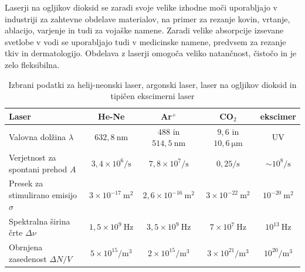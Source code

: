 Laserji na ogljikov dioksid se zaradi svoje velike izhodne moči uporabljajo v 
industriji za zahtevne obdelave materialov, na primer za rezanje 
kovin, vrtanje, ablacijo, varjenje in tudi za vojaške namene. Zaradi velike
absorpcije izsevane svetlobe v vodi se uporabljajo tudi v medicinske namene, predvsem
za rezanje tkiv in dermatologijo. 
Obdelava z laserji omogoča veliko natančnost, čistočo in je zelo fleksibilna.

\begin{table}
\small
\begin{center}
\setlength\tabcolsep{4pt}
\begin{tabular}{|l|c|c|c|c|}\hline
Laser & He-Ne & Ar$^+$ & CO$_2$ & ekscimer\\ \hline
Valovna dolžina  $\lambda$ & $632,8~\si{\nano\metre}$& $488$ in
$514,5~\si{\nano\metre}$ & $9,6$ in $10,6~\si{\micro\metre}$ & UV
\\ \hline
Verjetnost za spontani prehod $A$ & $3,4 \times 10^6/\si{\second}$ & 
$7,8 \times 10^7/\si{\second}$ & $0,25/\si{\second}$ & $\sim 10^8/\si{\second}$ \\ \hline
Presek za stimulirano emisijo $\sigma$ & $3 \times 10^{-17}~\si{\metre}^2$&  $2,6 \times 10^{-16}~\si{\metre}^2$ & $3 \times 10^{-22}~\si{\metre}^2$ & $ 10^{-20}~\si{\metre}^2$ \\ \hline
Spektralna širina črte $\Delta \nu$ & $1,5 \times 10^{9}~\si{\hertz}$ & 
$3,5 \times 10^{9}~\si{\hertz}$ &$7 \times 10^{7}~\si{\hertz}$ & $10^{13}~\si{\hertz}$ \\ \hline
Obrnjena zasedenost $\Delta N/V$ & $5 \times 10^{15}/\si{\metre}^3$ & $2 \times 10^{15}/\si{\metre}^3$ & $3 \times 10^{21}/\si{\metre}^3$ & $10^{20}/\si{\metre}^3$\\ \hline
\end{tabular}
\caption{Izbrani podatki za helij-neonski laser, argonski laser, laser na ogljikov dioksid in tipičen ekscimerni laser}
\label{tab:Ar}
\end{center}
\end{table}

